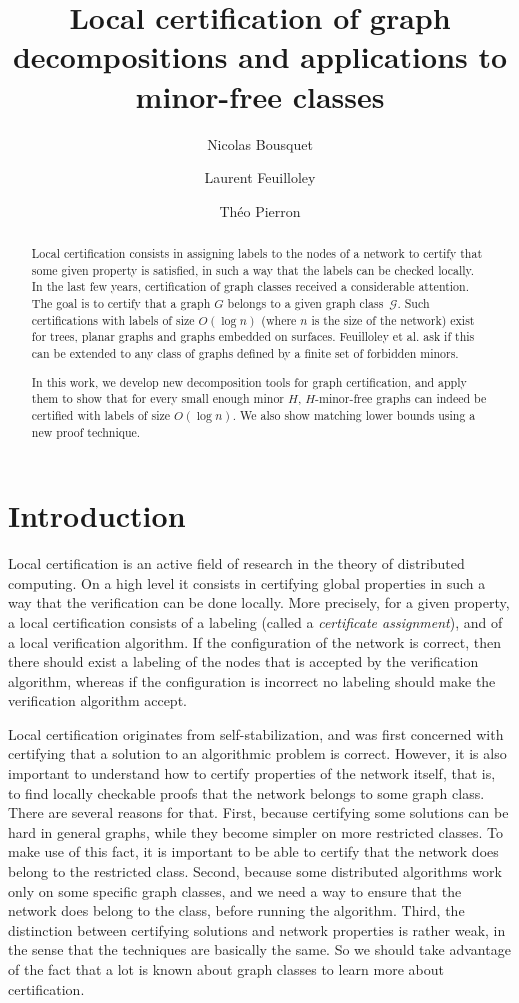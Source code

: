 \documentclass[a4paper,thm-restate,USenglish]{lipics-v2019}
\title{Local certification of graph decompositions and applications to minor-free classes}
\author{Nicolas Bousquet}{Univ. Lyon, Université Lyon 1, LIRIS UMR CNRS 5205, F-69621, Lyon, France}{nicolas.bousquet@univ-lyon1.fr}{https://orcid.org/0000-0003-0170-0503}{}
\author{Laurent Feuilloley}{Univ. Lyon, Université Lyon 1, LIRIS UMR CNRS 5205, F-69621, Lyon, France}{laurent.feuilloley@univ-lyon1.fr}{https://orcid.org/0000-0002-3994-0898}{}
\author{Théo Pierron}{Univ. Lyon, Université Lyon 1, LIRIS UMR CNRS 5205, F-69621, Lyon, France}{theo.pierron@univ-lyon1.fr}{https://orcid.org/0000-0002-5586-5613}{}
\begin{document}
\maketitle

\begin{abstract}
Local certification consists in assigning labels to the nodes of a network to certify that some given property is satisfied, in such a way that the labels can be checked locally.
In the last few years, certification of graph classes received a considerable attention. The goal is to certify that a graph $G$ belongs to a given graph class~$\mathcal{G}$. Such certifications with labels of size $O(\log n)$ (where $n$ is the size of the network) exist for trees, planar graphs and graphs embedded on surfaces. Feuilloley et al. ask if this can be extended to any class of graphs defined by a finite set of forbidden minors.

In this work, we develop new decomposition tools for graph certification, and apply them to show that for every small enough minor $H$, $H$-minor-free graphs can indeed be certified with labels of size $O(\log n)$. We also show matching lower bounds using a new proof technique. 
\end{abstract}

\section{Introduction}

Local certification is an active field of research in the theory of distributed computing. On a high level it consists in certifying global properties in such a way that the verification can be done locally. 
More precisely, for a given property, a local certification consists of a labeling (called a \emph{certificate assignment}), and of a local verification algorithm. 
If the configuration of the network is correct, then there should exist a labeling of the nodes that is accepted by the verification algorithm, whereas if the configuration is incorrect no labeling should make the verification algorithm accept.

Local certification originates from self-stabilization, and was first concerned with certifying that a solution to an algorithmic problem is correct.
However, it is also important to understand how to certify properties of the network itself,
that is, to find locally checkable proofs that the network belongs to some graph class. There are several reasons for that.
First, because certifying some solutions can be hard in general graphs, while they become simpler on more restricted classes. To make use of this fact, it is important to be able to certify that the network does belong to the restricted class.
Second, because some distributed algorithms work only on some specific graph classes, and we need a way to ensure that the network does belong to the class, before running the algorithm. 
Third, the distinction between certifying solutions and network properties is rather weak, in the sense that the techniques are basically the same. So we should take advantage of the fact that a lot is known about graph classes to learn more about certification. 
\end{document}
